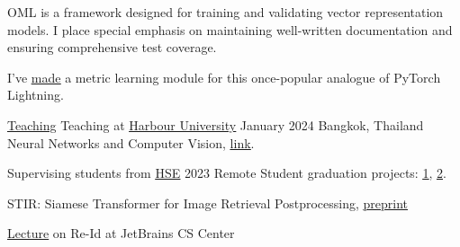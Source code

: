 
OML is a framework designed for training and validating vector representation models. I place special emphasis on maintaining well-written documentation and ensuring comprehensive test coverage.

\smallskip
\smallskip
\smallskip

I've
\underline{\href{https://medium.com/pytorch/metric-learning-with-catalyst-8c8337dfab1a}{made}}
a metric learning module for this once-popular analogue
of PyTorch Lightning.

\divider

\cvevent
{\href{https://research.jetbrains.org/groups/plt_lab/seminars}{Teaching}}
{Teaching at \href{https://harbour.space/}{\underline{Harbour University}}}
{January 2024}
{Bangkok, Thailand}
Neural Networks and Computer Vision, \href{https://harbour.space/data-science/courses/neural-networks-and-computer-vision-nikolenko-shabanov-1011}{\underline{link}}.

\smallskip
\smallskip
\smallskip

\cvevent
{}
{Supervising students from \href{https://www.hse.ru/en/}{\underline{HSE}}}
{2023}
{Remote}
Student graduation projects:
\href{https://github.com/nik-fedorov/term_paper_metric_learning}{\underline{1}}, 
\href{https://github.com/nastygorodi/PROJECT-Deep_Metric_Learning/tree/master}{\underline{2}}.

\divider


\cvevent{}
{STIR: Siamese Transformer for Image Retrieval Postprocessing,
\href{https://arxiv.org/abs/2304.13393}{\underline{preprint}}}
{}{}

{}{}


\cvevent{}
{\href{https://youtu.be/O8qtBYeOSKE}{\underline{Lecture}} on Re-Id at JetBrains CS Center}
{}{}
